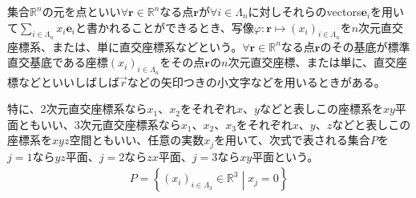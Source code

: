 \documentclass[dvipdfmx]{jsarticle}
\begin{document}
\begin{dfn}
集合$\mathbb{R}^{n}$の元を点といい$\forall\mathbf{r} \in \mathbb{R}^{n}$なる点$\mathbf{r}$が$\forall i \in \varLambda_{n}$に対しそれらのvectors$\mathbf{e}_{i}$を用いて$\sum_{i \in \varLambda_{n}} {x_{i}\mathbf{e}_{i}}$と書かれることができるとき、写像$\varphi:\mathbf{r} \mapsto \left( x_{i} \right)_{i \in \varLambda_{n}}$を$n$次元直交座標系、または、単に直交座標系などという。$\forall\mathbf{r} \in \mathbb{R}^{n}$なる点$\mathbf{r}$のその基底が標準直交基底である座標$\left( x_{i} \right)_{i \in \varLambda_{n}}$をその点$\mathbf{r}$の$n$次元直交座標、または単に、直交座標などといいしばしば$\overrightarrow{r}$などの矢印つきの小文字などを用いるときがある。
\end{dfn}
\begin{dfn}
特に、2次元直交座標系なら$x_{1}$、$x_{2}$をそれぞれ$x$、$y$などと表しこの座標系を$xy$平面ともいい、3次元直交座標系なら$x_{1}$、$x_{2}$、$x_{3}$をそれぞれ$x$、$y$、$z$などと表しこの座標系を$xyz$空間ともいい、任意の実数$x_{j}$を用いて、次式で表される集合$P$を$j = 1$なら$yz$平面、$j = 2$なら$zx$平面、$j = 3$なら$xy$平面という。
\begin{align*}
P = \left\{ \left( x_{i} \right)_{i \in \varLambda_{3}} \in \mathbb{R}^{3} \middle| x_{j} = 0 \right\}
\end{align*}
\end{dfn}
\end{document}
